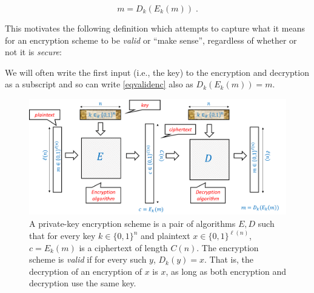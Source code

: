 \begin{equation*}
 m = D_k(E_k(m)) \;.
\end{equation*}

This motivates the following definition which attempts to capture what
it means for an encryption scheme to be \emph{valid} or ``make sense'',
regardless of whether or not it is \emph{secure}:

\hypertarget{encryptiondef}{}

We will often write the first input (i.e., the key) to the encryption
and decryption as a subscript and so can write \eqref{eqvalidenc} also
as \(D_k(E_k(m))=m\).

\begin{figure}
\centering
\includegraphics[width=\textwidth, height=0.25\paperheight, keepaspectratio]{../figure/valid_encryption_fig.png}
\caption{A private-key encryption scheme is a pair of algorithms \(E,D\)
such that for every key \(k\in \{0,1\}^n\) and plaintext
\(x\in \{0,1\}^{\ell(n)}\), \(c=E_k(m)\) is a ciphertext of length
\(C(n)\). The encryption scheme is \emph{valid} if for every such \(y\),
\(D_k(y)=x\). That is, the decryption of an encryption of \(x\) is
\(x\), as long as both encryption and decryption use the same key.}
\label{validencryption}
\end{figure}

